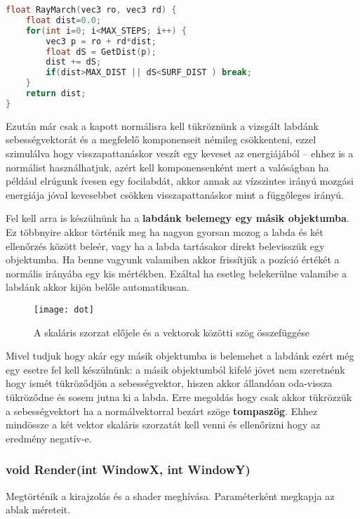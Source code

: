 \begin{lstlisting}[language={C++}]
float RayMarch(vec3 ro, vec3 rd) {
	float dist=0.0;    
    for(int i=0; i<MAX_STEPS; i++) {
    	vec3 p = ro + rd*dist;
        float dS = GetDist(p);
        dist += dS;
        if(dist>MAX_DIST || dS<SURF_DIST ) break;
    }    
    return dist;
}
\end{lstlisting}

Ezután már csak a kapott normálisra kell tükröznünk a vizsgált labdánk sebességvektorát és a megfelelő komponenseit némileg csökkenteni, ezzel szimulálva hogy visszapattanáskor veszít egy keveset az energiájából -- ehhez is a normálist használhatjuk, azért kell komponensenként mert a valóságban ha például elrúgunk ívesen egy focilabdát, akkor annak az vízszintes irányú mozgási energiája jóval kevesebbet csökken visszapattanáskor mint a függőleges irányú. 

Fel kell arra is készülnünk ha a \textbf{labdánk belemegy egy másik objektumba}. Ez többnyire akkor történik meg ha nagyon gyorsan mozog a labda és két ellenőrzés között beleér, vagy ha a labda tartásakor direkt belevisszük egy objektumba. Ha benne vagyunk valamiben akkor frissítjük a pozíció értékét a normális irányába egy kis mértékben.  Ezáltal ha esetleg belekerülne valamibe a labdánk akkor kijön belőle automatikusan.

\begin{figure}[H]
	\centering
	\texttt{[image: dot]}
	\caption{A skaláris szorzat előjele és a vektorok közötti szög összefüggése}
	\label{fig:dot}
\end{figure}

Mivel tudjuk hogy akár egy másik objektumba is belemehet a labdánk ezért még egy esetre fel kell készülnünk: a másik objektumból kifelé jövet nem szeretnénk hogy ismét tükröződjön a sebességvektor, hiszen akkor állandóan oda-vissza tükröződne és sosem jutna ki a labda. Erre megoldás hogy csak akkor tükrözzük a sebességvektort ha a normálvektorral bezárt szöge \textbf{tompaszög}. Ehhez mindössze a két vektor skaláris szorzatát kell venni és ellenőrizni hogy az eredmény negatív-e.

 
\subsubsection{void Render(int WindowX, int WindowY)} 

Megtörténik a kirajzolás és a shader meghívása. Paraméterként megkapja az ablak méreteit. 


